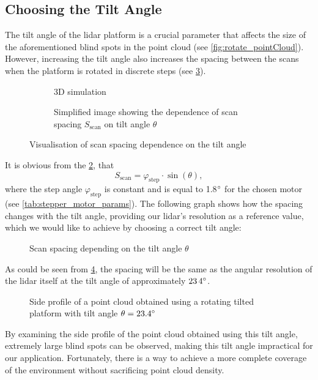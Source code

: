 \subsection{Choosing the Tilt Angle}
The tilt angle of the \gls{lidar} platform is a crucial parameter that affects the size of the aforementioned blind spots in the point cloud (see \cref{fig:rotate_pointCloud}).
However, increasing the tilt angle also increases the spacing between the scans when the platform is rotated in discrete steps (see \cref{fig:scan_spacing}). 
\begin{figure}[h!]
    \centering
    
    \begin{subfigure}{0.45\linewidth}
        \centering
        
        \caption{3D simulation}
        \label{fig:scan_spacing:3d}
    \end{subfigure}
    \hfill
    \begin{subfigure}{0.45\linewidth}
        \centering
        
        \caption{Simplified image showing the dependence of scan spacing $S_{\text{scan}}$ on tilt angle $\theta$}
        \label{fig:scan_spacing:tikz}
    \end{subfigure}

    \caption{Visualisation of scan spacing dependence on the tilt angle}
    \label{fig:scan_spacing}
\end{figure}
It is obvious from the \cref{fig:scan_spacing:tikz}, that
\begin{equation}
    S_{\text{scan}} = \varphi_{\text{step}}\cdot\sin(\theta),
\end{equation}
where the step angle $\varphi_{\text{step}}$ is constant and is equal to 1.8$\degree$ for the chosen motor (see \cref{tab:stepper_motor_params}).
The following graph shows how the spacing changes with the tilt angle, providing our \gls{lidar}'s resolution as a reference value, which we would like to achieve by choosing a correct tilt angle:
\begin{figure}[H]
    \centering
    
    \caption{Scan spacing depending on the tilt angle $\theta$}
    \label{fig:angleRes_tiltOnly}
\end{figure}    
As could be seen from \cref{fig:angleRes_tiltOnly}, the spacing will be the same as the angular resolution of the \gls{lidar} itself at the tilt angle of approximately $\si{23.4}{\degree}$.
\begin{figure}[H]
    \centering
    
    \caption{Side profile of a point cloud obtained using a rotating tilted platform with tilt angle $\theta=23.4\degree$}
    \label{fig:23point4rotate_pointCloud}
\end{figure}
By examining the side profile of the point cloud obtained using this tilt angle, extremely large blind spots can be observed, making this tilt angle impractical for our application.
Fortunately, there is a way to achieve a more complete coverage of the environment without sacrificing point cloud density.
